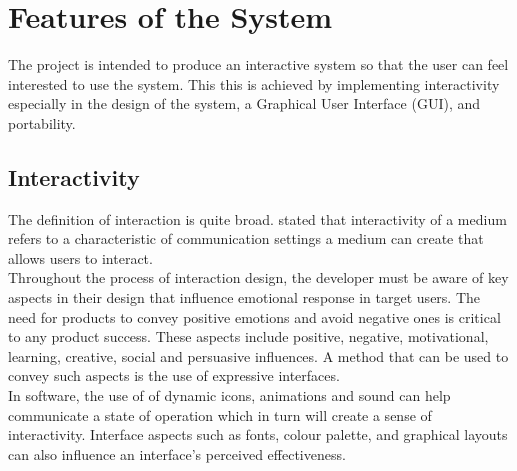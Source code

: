 \documentclass[twoside, a4paper, 12pt]{report}
\begin{document}
\section{Features of the System}
The project is intended to produce an interactive system so that the user can feel interested to use the system. This this is achieved by implementing interactivity especially in the design of the system, a Graphical User Interface (GUI), and portability.

\subsection{Interactivity}
The definition of interaction is quite broad. \autocite{aoki2000taxonomy} stated that interactivity of a medium refers to a characteristic of communication settings a medium can create that allows users to interact.\\
\indent
Throughout the process of interaction design, the developer must be aware of key aspects in their design that influence emotional response in target users. The need for products to convey positive emotions and avoid negative ones is critical to any product success. These aspects include positive, negative, motivational, learning, creative, social and persuasive influences. A method that can be used to convey such aspects is the use of expressive interfaces. \autocite{kamari2011interactive} \\
\indent
In software, the use of of dynamic icons, animations and sound can help communicate a state of operation which in turn will create a sense of interactivity. Interface aspects such as fonts, colour palette, and graphical layouts can also influence an interface's perceived effectiveness.
\end{document}
